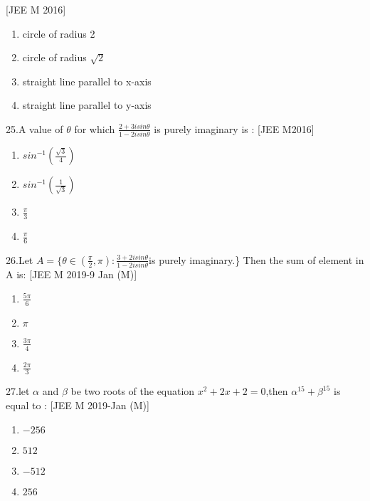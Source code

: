 \documentclass[journal,12pt,twocolumn]{IEEEtran}
\theoremstyle{remark}
\begin{document}
\begin{ducument}
\hfill{\color{magenta}[JEE M 2016]}
\begin{multicols}{2}
\begin{enumerate}
\item circle of radius 2
\item circle of radius $\surd2$
\item straight line parallel to x-axis
\item straight line parallel to y-axis
\end{enumerate}
\end{multicols}
\item 25.A value of $\theta$ for which $\frac{2+3isin\theta}{1-2isin\theta}$ is purely imaginary is :
\hfill{\color{magenta}[JEE M2016]}
\begin{multicols}{2}
\begin{enumerate}
\item $sin^{-1}\left(\frac{\surd3}{4}\right)$
\item $sin^{-1}\left(\frac{1}{\surd3}\right)$
\item $\frac{\pi}{3}$
\item $\frac{\pi}{6}$
\end{enumerate}
\end{multicols}
\item 26.Let  $A=\{\theta \in \left(\frac{\pi}{2},\pi\right) :\frac{3+2isin\theta}{1-2isin\theta}$is purely imaginary.\} Then the sum of element in A is:
\hfill{\color{magenta}[JEE M 2019-9 Jan (M)]}
\begin{multicols}{2}
\begin{enumerate}
\item $\frac{5\pi}{6}$
\item $\pi$
\item $\frac{3\pi}{4}$
\item $\frac{2\pi}{3}$
\end{enumerate}
\end{multicols}
\item 27.let $\alpha$ and $\beta$ be two roots of the equation $x^2+2x+2=0$,then $\alpha^{15}+\beta^{15}$ is equal to :
\hfill{\color{magenta}[JEE M 2019-Jan (M)]}
\begin{multicols}{2}
\begin{enumerate}
\item $-256$
\item $512$
\item $-512$
\item $256$
\end{enumerate}
\end{multicols}

\end{ducument}
\end{document}
